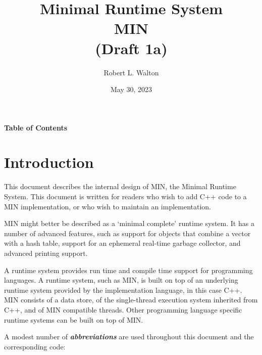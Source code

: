 \documentclass[12pt]{article}
\makeatletter
\renewcommand\tableofcontents{%
    \begin{list}{}%
	     {\setlength{\itemsep}{0in}%
	      \setlength{\topsep}{0in}%
	      \setlength{\parsep}{1ex}%
	      \setlength{\labelwidth}{0in}%
	      \setlength{\baselineskip}{1.5ex}%
	      \setlength{\leftmargin}{0.8in}%
	      \setlength{\rightmargin}{0.8in}}%
    \item\@starttoc{toc}%
    \end{list}}
\newcommand{\skey}[2]{{\bf \em #1#2}\index{#1}}
\makeatother
\begin{document}
        
\title{Minimal Runtime System\\[2ex]MIN\\[2ex]
       (Draft 1a)}

\author{Robert L. Walton}

\date{May 30, 2023}
 
\maketitle

\newpage
\begin{center}
\large \bf Table of Contents
\end{center}

\bigskip

\tableofcontents 

\newpage

\section{Introduction}

This document describes the internal design of MIN,
the Minimal Runtime System.
This document is written for readers who wish to add C++ code
to a MIN implementation, or who wish to maintain an implementation.

MIN might better be described as a `minimal complete' runtime system.
It has a number of advanced features, such as support for objects
that combine a vector with a hash table, support for an ephemeral
real-time garbage collector, and advanced printing support.

A runtime system provides run time and compile time support
for programming languages.
A runtime system, such as MIN, is
built on top of an underlying runtime system provided by the
implementation language, in this case C++.
MIN consists of a data store, of the single-thread execution system
inherited from C++, and of MIN compatible threads.
Other programming language specific
runtime systems can be built on top of MIN.

A modest number of \skey{abbreviation}s are used throughout this document
and the corresponding code:
\end{document}
